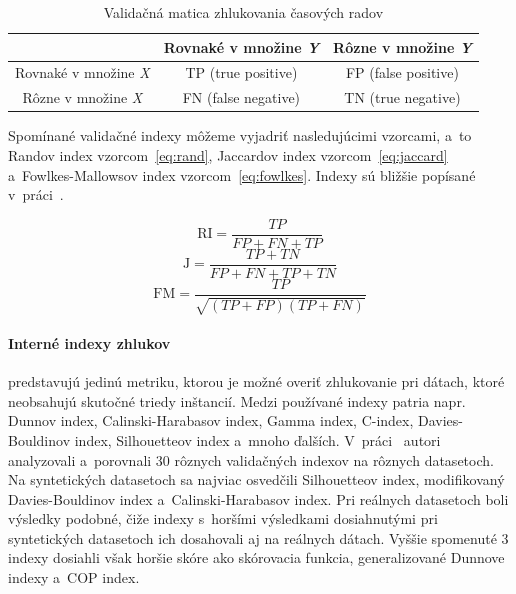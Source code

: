 \documentclass[a4paper,twoside,slovak,12pt,appendix]{article}
\begin{document}
\begin{table}[htbp]
	\centering
	\caption{Validačná matica zhlukovania časových radov}
	\label{tab:validation-matrix}
	\begin{tabular}{|c|c|c|}
		\hline
		 																		&  Rovnaké v množine \textit{Y}   &  Rôzne v množine \textit{Y}   \\ \hline
		Rovnaké v množine \textit{X}  			&  TP (true positive)   					&  FP (false positive)  				\\ \hline
		Rôzne v množine \textit{X}  				&  FN (false negative)  					&  TN (true negative)   				\\ \hline
	\end{tabular}
\end{table}

\noindent
Spomínané validačné indexy môžeme vyjadriť nasledujúcimi vzorcami, a~to Randov
index vzorcom~\ref{eq:rand}, Jaccardov index vzorcom~\ref{eq:jaccard}
a~Fowlkes-Mallowsov index vzorcom~\ref{eq:fowlkes}. Indexy sú bližšie popísané
v~práci~\cite{Bilgic2018}.

\begin{equation}
	\label{eq:rand}
  \text{RI} = \frac{TP}{FP + FN + TP}
\end{equation}
\begin{equation}
	\label{eq:jaccard}
  \text{J} = \frac{TP + TN}{FP + FN + TP + TN}
\end{equation}
\begin{equation}
	\label{eq:fowlkes}
  \text{FM} = \frac{TP}{\sqrt{(TP + FP)(TP + FN)}}
\end{equation}

\paragraph{Interné indexy zhlukov} predstavujú jedinú metriku, ktorou je možné
overiť zhlukovanie pri dátach, ktoré neobsahujú skutočné triedy inštancií. Medzi
používané indexy patria napr. Dunnov index, Calinski-Harabasov index, Gamma
index, C-index, Davies-Bouldinov index, Silhouetteov index a~mnoho ďalších.
V~práci~\cite{Arbelaitz2013} autori analyzovali a~porovnali 30 rôznych
validačných indexov na rôznych datasetoch. Na syntetických datasetoch sa najviac
osvedčili Silhouetteov index, modifikovaný Davies-Bouldinov index
a~Calinski-Harabasov index. Pri reálnych datasetoch boli výsledky podobné, čiže
indexy s~horšími výsledkami dosiahnutými pri syntetických datasetoch ich
dosahovali aj na reálnych dátach. Vyššie spomenuté 3 indexy dosiahli však horšie
skóre ako skórovacia funkcia, generalizované Dunnove indexy a~COP index.
\end{document}
